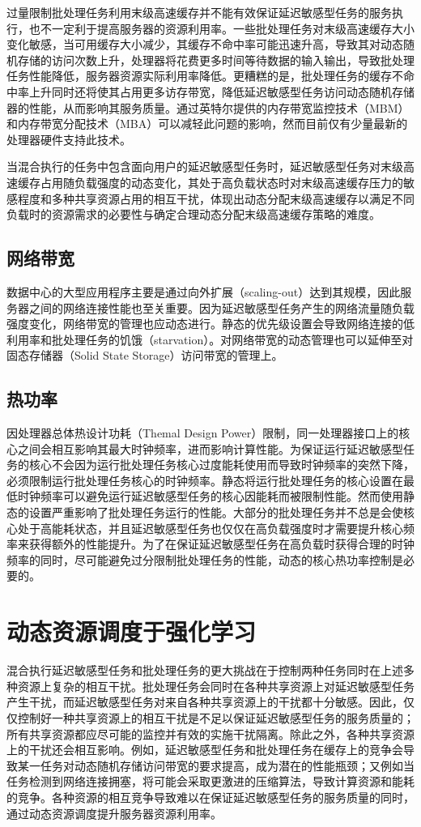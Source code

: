 过量限制批处理任务利用末级高速缓存并不能有效保证延迟敏感型任务的服务执行，也不一定利于提高服务器的资源利用率。一些批处理任务对末级高速缓存大小变化敏感，当可用缓存大小减少，其缓存不命中率可能迅速升高，导致其对动态随机存储的访问次数上升，处理器将花费更多时间等待数据的输入输出，导致批处理任务性能降低，服务器资源实际利用率降低。更糟糕的是，批处理任务的缓存不命中率上升同时还将使其占用更多访存带宽，降低延迟敏感型任务访问动态随机存储器的性能，从而影响其服务质量。通过英特尔提供的内存带宽监控技术（MBM）和内存带宽分配技术（MBA）可以减轻此问题的影响，然而目前仅有少量最新的处理器硬件支持此技术。

当混合执行的任务中包含面向用户的延迟敏感型任务时，延迟敏感型任务对末级高速缓存占用随负载强度的动态变化，其处于高负载状态时对末级高速缓存压力的敏感程度和多种共享资源占用的相互干扰，体现出动态分配末级高速缓存以满足不同负载时的资源需求的必要性与确定合理动态分配末级高速缓存策略的难度。


\subsection{网络带宽}
数据中心的大型应用程序主要是通过向外扩展（scaling-out）达到其规模，因此服务器之间的网络连接性能也至关重要。因为延迟敏感型任务产生的网络流量随负载强度变化，网络带宽的管理也应动态进行。静态的优先级设置会导致网络连接的低利用率和批处理任务的饥饿（starvation）\cite{pattara2002starvation}。对网络带宽的动态管理也可以延伸至对固态存储器（Solid State Storage）访问带宽的管理上\cite{seong2010hydra}。

\subsection{热功率}
因处理器总体热设计功耗（Themal Design Power）限制，同一处理器接口上的核心之间会相互影响其最大时钟频率，进而影响计算性能。为保证运行延迟敏感型任务的核心不会因为运行批处理任务核心过度能耗使用而导致时钟频率的突然下降，必须限制运行批处理任务核心的时钟频率。静态将运行批处理任务的核心设置在最低时钟频率可以避免运行延迟敏感型任务的核心因能耗而被限制性能。然而使用静态的设置严重影响了批处理任务运行的性能。大部分的批处理任务并不总是会使核心处于高能耗状态，并且延迟敏感型任务也仅仅在高负载强度时才需要提升核心频率来获得额外的性能提升。为了在保证延迟敏感型任务在高负载时获得合理的时钟频率的同时，尽可能避免过分限制批处理任务的性能，动态的核心热功率控制是必要的。

\section{动态资源调度于强化学习}
混合执行延迟敏感型任务和批处理任务的更大挑战在于控制两种任务同时在上述多种资源上复杂的相互干扰。批处理任务会同时在各种共享资源上对延迟敏感型任务产生干扰，而延迟敏感型任务对来自各种共享资源上的干扰都十分敏感。因此，仅仅控制好一种共享资源上的相互干扰是不足以保证延迟敏感型任务的服务质量的；所有共享资源都应尽可能的监控并有效的实施干扰隔离。除此之外，各种共享资源上的干扰还会相互影响。例如，延迟敏感型任务和批处理任务在缓存上的竞争会导致某一任务对动态随机存储访问带宽的要求提高，成为潜在的性能瓶颈；又例如当任务检测到网络连接拥塞，将可能会采取更激进的压缩算法，导致计算资源和能耗的竞争。各种资源的相互竞争导致难以在保证延迟敏感型任务的服务质量的同时，通过动态资源调度提升服务器资源利用率。

